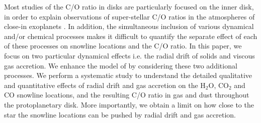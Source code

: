 \documentclass[apj]{emulateapj}
\newcommand{\emgr}[1]{\emph{ \color{gray} #1}}
\begin{document}
Most studies of the C/O ratio in disks are particularly focused on the inner disk, in order to explain observations of super-stellar C/O ratios in the atmospheres of close-in exoplanets \citep{madhu11}. In addition, the simultaneous inclusion of various dynamical and/or chemical processes makes it difficult to quantify the separate effect of each of these processes on snowline locations and the C/O ratio. In this paper, we focus on two particular dynamical effects i.e. the radial drift of solids and viscous gas accretion. We enhance the model of \citet{oberg11} by considering these two additional processes. We perform a systematic study to understand the detailed qualitative and quantitative effects of radial drift and gas accretion on the H$_2$O, CO$_2$ and CO snowline locations, and the resulting C/O ratio in gas and dust throughout the protoplanetary disk. More importantly, we obtain a limit on how close to the star the snowline locations can be pushed by radial drift and gas accretion.   



\end{document}

